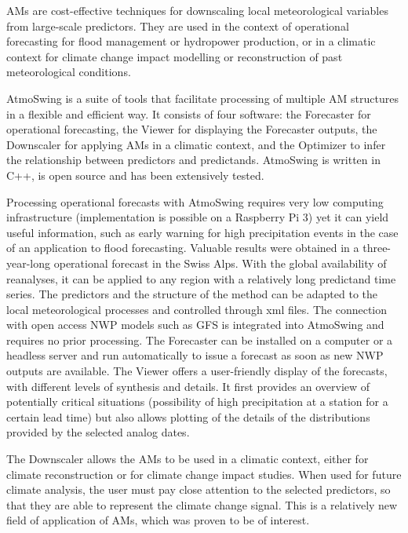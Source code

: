 \documentclass[gmdd]{copernicus}
\begin{document}
\conclusions  %
\label{sec:conclusions}

AMs are cost-effective techniques for downscaling local meteorological variables from large-scale predictors. They are used in the context of operational forecasting for flood management or hydropower production, or in a climatic context for climate change impact modelling or reconstruction of past meteorological conditions. 

AtmoSwing is a suite of tools that facilitate processing of multiple AM structures in a flexible and efficient way. It consists of four software: the Forecaster for operational forecasting, the Viewer for displaying the Forecaster outputs, the Downscaler for applying AMs in a climatic context, and the Optimizer to infer the relationship between predictors and predictands. AtmoSwing is written in C++, is open source and has been extensively tested.

Processing operational forecasts with AtmoSwing requires very low computing infrastructure (implementation is possible on a Raspberry Pi 3) yet it can yield useful information, such as early warning for high precipitation events in the case of an application to flood forecasting. Valuable results were obtained in a three-year-long operational forecast in the Swiss Alps. With the global availability of reanalyses, it can be applied to any region with a relatively long predictand time series. The predictors and the structure of the method can be adapted to the local meteorological processes and controlled through xml files. The connection with open access NWP models such as GFS is integrated into AtmoSwing and requires no prior processing. The Forecaster can be installed on a computer or a headless server and run automatically to issue a forecast as soon as new NWP outputs are available. The Viewer offers a user-friendly display of the forecasts, with different levels of synthesis and details. It first provides an overview of potentially critical situations (possibility of high precipitation at a station for a certain lead time) but also allows plotting of the details of the distributions provided by the selected analog dates.

The Downscaler allows the AMs to be used in a climatic context, either for climate reconstruction or for climate change impact studies. When used for future climate analysis, the user must pay close attention to the selected predictors, so that they are able to represent the climate change signal. This is a relatively new field of application of AMs, which was proven to be of interest.
\end{document}
